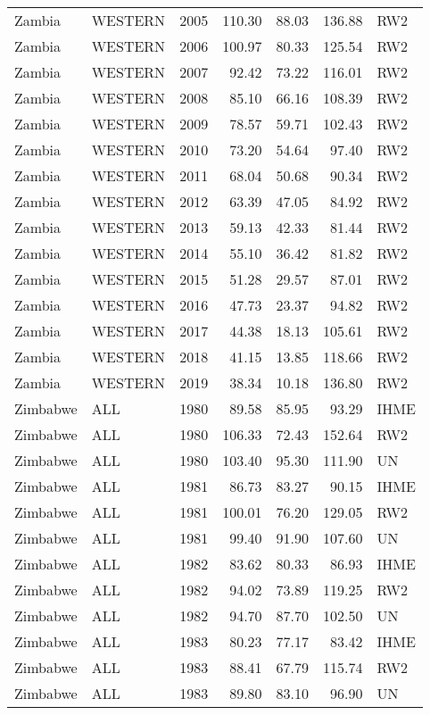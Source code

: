 \begin{longtable}{lllrrrl}
  Zambia & WESTERN & 2005 & 110.30 & 88.03 & 136.88 & RW2 \\ 
  Zambia & WESTERN & 2006 & 100.97 & 80.33 & 125.54 & RW2 \\ 
  Zambia & WESTERN & 2007 & 92.42 & 73.22 & 116.01 & RW2 \\ 
  Zambia & WESTERN & 2008 & 85.10 & 66.16 & 108.39 & RW2 \\ 
  Zambia & WESTERN & 2009 & 78.57 & 59.71 & 102.43 & RW2 \\ 
  Zambia & WESTERN & 2010 & 73.20 & 54.64 & 97.40 & RW2 \\ 
  Zambia & WESTERN & 2011 & 68.04 & 50.68 & 90.34 & RW2 \\ 
  Zambia & WESTERN & 2012 & 63.39 & 47.05 & 84.92 & RW2 \\ 
  Zambia & WESTERN & 2013 & 59.13 & 42.33 & 81.44 & RW2 \\ 
  Zambia & WESTERN & 2014 & 55.10 & 36.42 & 81.82 & RW2 \\ 
  Zambia & WESTERN & 2015 & 51.28 & 29.57 & 87.01 & RW2 \\ 
  Zambia & WESTERN & 2016 & 47.73 & 23.37 & 94.82 & RW2 \\ 
  Zambia & WESTERN & 2017 & 44.38 & 18.13 & 105.61 & RW2 \\ 
  Zambia & WESTERN & 2018 & 41.15 & 13.85 & 118.66 & RW2 \\ 
  Zambia & WESTERN & 2019 & 38.34 & 10.18 & 136.80 & RW2 \\ 
  Zimbabwe & ALL & 1980 & 89.58 & 85.95 & 93.29 & IHME \\ 
  Zimbabwe & ALL & 1980 & 106.33 & 72.43 & 152.64 & RW2 \\ 
  Zimbabwe & ALL & 1980 & 103.40 & 95.30 & 111.90 & UN \\ 
  Zimbabwe & ALL & 1981 & 86.73 & 83.27 & 90.15 & IHME \\ 
  Zimbabwe & ALL & 1981 & 100.01 & 76.20 & 129.05 & RW2 \\ 
  Zimbabwe & ALL & 1981 & 99.40 & 91.90 & 107.60 & UN \\ 
  Zimbabwe & ALL & 1982 & 83.62 & 80.33 & 86.93 & IHME \\ 
  Zimbabwe & ALL & 1982 & 94.02 & 73.89 & 119.25 & RW2 \\ 
  Zimbabwe & ALL & 1982 & 94.70 & 87.70 & 102.50 & UN \\ 
  Zimbabwe & ALL & 1983 & 80.23 & 77.17 & 83.42 & IHME \\ 
  Zimbabwe & ALL & 1983 & 88.41 & 67.79 & 115.74 & RW2 \\ 
  Zimbabwe & ALL & 1983 & 89.80 & 83.10 & 96.90 & UN \\ 

\end{longtable}
